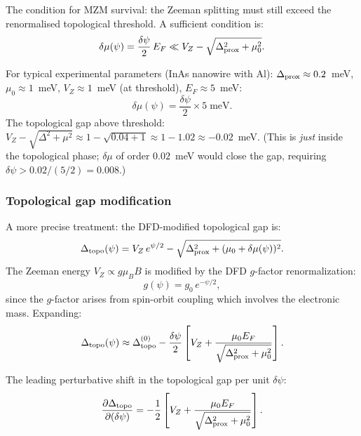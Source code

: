 \documentclass[11pt]{article}
\begin{document}
The condition for MZM survival: the Zeeman splitting must still exceed the
renormalised topological threshold. A sufficient condition is:
\begin{equation}
\delta\mu(\psi) = \frac{\delta\psi}{2}\,E_F \ll V_Z - \sqrt{\Delta_{\rm prox}^2 + \mu_0^2}.
\label{eq:MZM-condition}
\end{equation}

For typical experimental parameters (InAs nanowire with Al):
$\Delta_{\rm prox} \approx 0.2$~meV, $\mu_0 \approx 1$~meV,
$V_Z \approx 1$~meV (at threshold), $E_F \approx 5$~meV:
\begin{equation}
\delta\mu(\psi) = \frac{\delta\psi}{2} \times 5\;\text{meV}.
\label{eq:dmu-InAs}
\end{equation}
The topological gap above threshold:
$V_Z - \sqrt{\Delta^2 + \mu^2} \approx 1 - \sqrt{0.04 + 1} \approx 1 - 1.02 \approx -0.02$~meV.
(This is \emph{just} inside the topological phase; $\delta\mu$ of order $0.02$~meV
would close the gap, requiring $\delta\psi > 0.02/(5/2) = 0.008$.)

\subsubsection{Topological gap modification}

A more precise treatment: the DFD-modified topological gap is:
\begin{equation}
\Delta_{\rm topo}(\psi) = V_Z\,e^{\psi/2} - \sqrt{\Delta_{\rm prox}^2
  + (\mu_0 + \delta\mu(\psi))^2}.
\label{eq:Delta-topo-psi}
\end{equation}
The Zeeman energy $V_Z \propto g\mu_B B$ is modified by the DFD $g$-factor
renormalization:
\begin{equation}
g(\psi) = g_0\,e^{-\psi/2},
\label{eq:g-psi}
\end{equation}
since the $g$-factor arises from spin-orbit coupling which involves the
electronic mass. Expanding:
\begin{equation}
\Delta_{\rm topo}(\psi) \approx \Delta_{\rm topo}^{(0)}
  - \frac{\delta\psi}{2}\left[V_Z + \frac{\mu_0 E_F}{\sqrt{\Delta_{\rm prox}^2 + \mu_0^2}}\right].
\label{eq:Delta-topo-expand}
\end{equation}

The leading perturbative shift in the topological gap per unit $\delta\psi$:
\begin{equation}
\frac{\partial\Delta_{\rm topo}}{\partial(\delta\psi)}
= -\frac{1}{2}\left[V_Z + \frac{\mu_0 E_F}{\sqrt{\Delta_{\rm prox}^2 + \mu_0^2}}\right].
\label{eq:dDelta-dpsi}
\end{equation}
\end{document}
